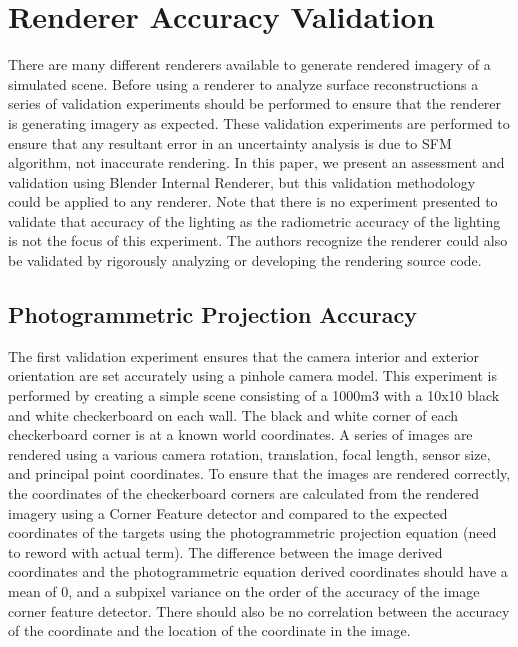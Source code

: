 \section{Renderer Accuracy Validation}

There are many different renderers available to generate rendered imagery of a simulated scene.  Before using a renderer to analyze surface reconstructions a series of validation experiments should be performed to ensure that the renderer is generating imagery as expected.  These validation experiments are performed to ensure that any resultant error in an uncertainty analysis is due to SFM algorithm, not inaccurate rendering.  In this paper, we present an assessment and validation using Blender Internal Renderer, but this validation methodology could be applied to any renderer.  Note that there is no experiment presented to validate that accuracy of the lighting as the radiometric accuracy of the lighting is not the focus of this experiment.  The authors recognize the renderer could also be validated by rigorously analyzing or developing the rendering source code.

\subsection{Photogrammetric Projection Accuracy}
The first validation experiment ensures that the camera interior and exterior orientation are set accurately using a pinhole camera model.  This experiment is performed by creating a simple scene consisting of a 1000m3 with a 10x10 black and white checkerboard on each wall.   The black and white corner of each checkerboard corner is at a known world coordinates.  A series of images are rendered using a various camera rotation, translation, focal length, sensor size, and principal point coordinates.  To ensure that the images are rendered correctly, the coordinates of the checkerboard corners are calculated from the rendered imagery using a Corner Feature detector and compared to the expected coordinates of the targets using the photogrammetric projection equation (need to reword with actual term).  The difference between the image derived coordinates and the photogrammetric equation derived coordinates should have a mean of 0, and a subpixel variance on the order of the accuracy of the image corner feature detector.  There should also be no correlation between the accuracy of the coordinate and the location of the coordinate in the image.
 
